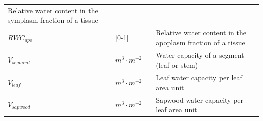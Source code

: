 \documentclass[]{book}
\begin{document}
\begin{longtable}[]{@{}llll@{}}
\begin{minipage}[t]{0.45\columnwidth}
Relative water content in the symplasm fraction of a tissue\strut
\end{minipage}\tabularnewline
\begin{minipage}[t]{0.11\columnwidth}\raggedright\strut
\(RWC_{apo}\)\strut
\end{minipage} & \begin{minipage}[t]{0.10\columnwidth}\raggedright\strut
{[}0-1{]}\strut
\end{minipage} & \begin{minipage}[t]{0.12\columnwidth}\raggedright\strut
\strut
\end{minipage} & \begin{minipage}[t]{0.45\columnwidth}\raggedright\strut
Relative water content in the apoplasm fraction of a tissue\strut
\end{minipage}\tabularnewline
\begin{minipage}[t]{0.11\columnwidth}\raggedright\strut
\(V_{segment}\)\strut
\end{minipage} & \begin{minipage}[t]{0.10\columnwidth}\raggedright\strut
\(m^3 \cdot m^{-2}\)\strut
\end{minipage} & \begin{minipage}[t]{0.12\columnwidth}\raggedright\strut
\strut
\end{minipage} & \begin{minipage}[t]{0.45\columnwidth}\raggedright\strut
Water capacity of a segment (leaf or stem)\strut
\end{minipage}\tabularnewline
\begin{minipage}[t]{0.11\columnwidth}\raggedright\strut
\(V_{leaf}\)\strut
\end{minipage} & \begin{minipage}[t]{0.10\columnwidth}\raggedright\strut
\(m^3 \cdot m^{-2}\)\strut
\end{minipage} & \begin{minipage}[t]{0.12\columnwidth}\raggedright\strut
\strut
\end{minipage} & \begin{minipage}[t]{0.45\columnwidth}\raggedright\strut
Leaf water capacity per leaf area unit\strut
\end{minipage}\tabularnewline
\begin{minipage}[t]{0.11\columnwidth}\raggedright\strut
\(V_{sapwood}\)\strut
\end{minipage} & \begin{minipage}[t]{0.10\columnwidth}\raggedright\strut
\(m^3 \cdot m^{-2}\)\strut
\end{minipage} & \begin{minipage}[t]{0.12\columnwidth}\raggedright\strut
\strut
\end{minipage} & \begin{minipage}[t]{0.45\columnwidth}\raggedright\strut
Sapwood water capacity per leaf area unit\strut
\end{minipage}\tabularnewline
\bottomrule
\end{longtable}
\end{document}
